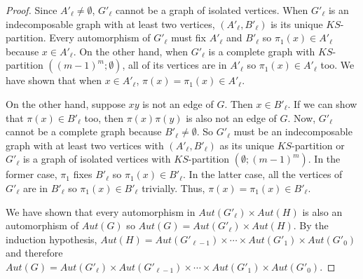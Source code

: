 \documentclass[11pt]{article}
\begin{document}
\begin{proof}
Since $A'_\ell \neq \emptyset$, $G'_\ell$ cannot be a graph of isolated vertices.   When  $G'_\ell$  is an  indecomposable graph with at least two vertices, $(A'_\ell, B'_\ell)$ is its unique $KS$-partition.  Every automorphism of $G'_\ell$  must fix $A'_\ell$ and $B'_\ell$ so $\pi_1(x) \in A'_\ell$ because $x \in A'_\ell$.  On the other hand, when $G'_\ell$ is a complete graph  with $KS$-partition $((m-1)^m; \emptyset)$, all of its vertices are in $A'_\ell$ so $\pi_1(x) \in A'_\ell$ too.  We have shown that when $x \in A'_\ell$, $\pi(x) = \pi_1(x) \in A'_\ell$.  

 
 On the other hand, suppose $xy$ is not an edge of $G$.  Then $x \in B'_\ell$.   If we can show that $\pi(x) \in B'_\ell$ too, then $\pi(x) \pi(y)$ is also not an edge of $G$.  Now, $G'_\ell$ cannot be a complete graph because $B'_\ell \neq \emptyset$.  So $G'_\ell$ must be an  indecomposable graph with at least two vertices with $(A'_\ell, B'_\ell)$ as its unique $KS$-partition or $G'_\ell$ is a graph of isolated vertices with $KS$-partition $(\emptyset; (m-1)^m)$.  In the former case, $\pi_1$ fixes $B'_\ell$ so $\pi_1(x) \in B'_\ell$.  In the latter case, all the vertices of $G'_\ell$ are in $B'_\ell$ so $\pi_1(x) \in B'_\ell$ trivially.   Thus, $\pi(x) = \pi_1(x) \in B'_\ell$. 
 
 We have shown that every automorphism in $Aut(G'_\ell) \times Aut(H)$ is also an automorphism of $Aut(G)$ so $Aut(G) = Aut(G'_\ell) \times Aut(H)$.  By the induction hypothesis,  $Aut(H) = Aut(G'_{\ell-1}) \times \cdots \times Aut(G'_1) \times Aut(G'_0)$ and therefore $Aut(G) = Aut(G'_\ell) \times Aut(G'_{\ell-1}) \times \cdots \times Aut(G'_1) \times Aut(G'_0).$
\end{proof}
 


\end{document}
